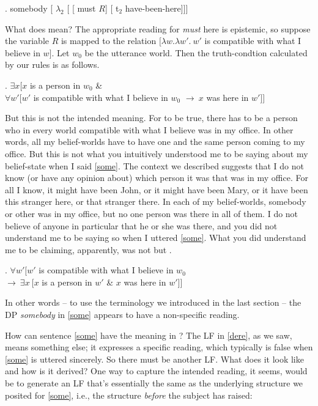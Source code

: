 \exi. \label{dere} somebody [ $\lambda_2$ [ [ must $R$] [ t$_2$ have-been-here]]]

What does \Last mean? The appropriate reading for \emph{must} here is epistemic, so suppose the variable $R$ is mapped to the relation $\bigl[\lambda w.\lambda w'.\ w'$ is compatible with what I believe in $w\bigr]$. Let $w_{0}$ be the utterance world. Then the truth-condtion calculated by our rules is as follows.

\ex. $\exists x [x$ is a person in $w_{0}$ \& \\
$\forall w'[w'$ is compatible with what I believe in $w_{0}$ $\rightarrow\ x$ was here in $w'$]]

But this is not the intended meaning. For \Last to be true, there has to be a person who in every world compatible with what I believe was in my office. In other words, all my belief-worlds have to have one and the same person coming to my office. But this is not what you intuitively understood me to be saying about my belief-state when I said \ref{some}. The context we described suggests that I do not know (or have any opinion about) which person it was that was in my office. For all I know, it might have been John, or it might have been Mary, or it have been this stranger here, or that stranger there. In each of my belief-worlds, somebody or other was in my office, but no one person was there in all of them. I do not believe of anyone in particular that he or she was there, and you did not understand me to be saying so when I uttered \ref{some}. What you did understand me to be claiming, apparently, was not \Last but \Next.

\ex. \label{dedic} $\forall w' [ w'$ is compatible with what I believe in $w_{0}$\\
\null\hfill$\rightarrow\ \exists x\ [x$ is a person in $w'$ \& $x$ was here in $w']]$

In other words -- to use the terminology we introduced in the last section -- the DP \emph{somebody} in \ref{some} appears to have a non-specific reading.

How can sentence \ref{some} have the meaning in \Last? The LF in \ref{dere}, as we saw, means something else; it expresses a specific reading, which typically is false when \ref{some} is uttered sincerely. So there must be another LF. What does it look like and how is it derived? One way to capture the intended reading, it seems, would be to generate an LF that's essentially the same as the underlying structure we posited for \ref{some}, i.e., the structure \emph{before} the subject has raised:

